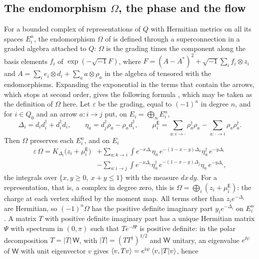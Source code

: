 \subsection{The endomorphism \texorpdfstring{$\Omega$}{Omega}, the phase and the flow}
For a bounded complex of representations of $Q$ with Hermitian metrics on all
its spaces $E_i^n$, the endomorphism $\Omega$ of \cite[\S5.4]{hkkp26} is
defined through a superconnection in a graded algebra attached to $Q$:
$\Omega$ is the grading times the component along the basis elements $f_i$
of $\exp(-\sqrt{-1}F)$, where
$F=(A-A^*)^2+\sqrt{-1}\sum_if_i\otimes z_i$ and
$A=\sum_ie_i\otimes d_i+\sum_aa\otimes\rho_a$ in the algebra of
\cite[Definition~5.13]{hkkp26} tensored with the endomorphisms. Expanding the
exponential in the terms that contain the arrows, which stops at second
order, gives the following formula \cite[Proposition~2.1]{wue26c}, which may
be taken as the definition of $\Omega$ here. Let $\varepsilon$ be the grading, equal
to $(-1)^n$ in degree $n$, and for $i\in Q_0$ and an arrow $a:i\to j$ put,
on $E_i=\bigoplus_nE_i^n$,
\[
 \Delta_i=d_id_i^\dagger+d_i^\dagger d_i,\qquad
 \eta_a=d_j^\dagger\rho_a-\rho_ad_i^\dagger,\qquad
 \mu_i^{\mathsf E}=\sum_{a:i\to\cdot}\rho_a^\dagger\rho_a-\sum_{a:\cdot\to i}\rho_a\rho_a^\dagger .
\]
Then $\Omega$ preserves each $E_i^n$, and on $E_i$
\begin{equation}\label{eq:general}
 \begin{aligned}
 \varepsilon\,\Omega=K_{\Delta_i}\bigl(z_i+\mu_i^{\mathsf E}\bigr)
 &+\sum_{a:k\to i}\int e^{-x\Delta_i}\eta_a\,e^{-(1-x-y)\Delta_k}\eta_a^\dagger\,e^{-y\Delta_i}\\
 &-\sum_{a:i\to j}\int e^{-x\Delta_i}\eta_a^\dagger\,e^{-(1-x-y)\Delta_j}\eta_a\,e^{-y\Delta_i},
 \end{aligned}
\end{equation}
the integrals over $\{x,y\geq0,\ x+y\leq1\}$ with the measure $dx\,dy$. For a
representation, that is, a complex in degree zero, this is
$\Omega=\bigoplus_i(z_i+\mu_i^{\mathsf E})$: the charge at each vertex shifted
by the moment map. All terms other than
$z_ie^{-\Delta_i}$ are Hermitian, so $(-1)^n\Omega$ has the positive definite
imaginary part $y_ie^{-\Delta_i}$ on $E_i^n$. A matrix $T$ with positive
definite imaginary part has a unique Hermitian matrix $\Psi$ with spectrum in
$(0,\pi)$ such that $Te^{-\ii\Psi}$ is positive definite: in the polar
decomposition $T=|T|\,\mathsf W$, with $|T|=(TT^\dagger)^{1/2}$ and
$\mathsf W$ unitary, an eigenvalue $e^{\ii\psi}$ of $\mathsf W$ with unit
eigenvector $v$ gives $\left\langle v,Tv\right\rangle=e^{\mathrm i\psi}\left\langle v,|T|v\right\rangle$, hence
